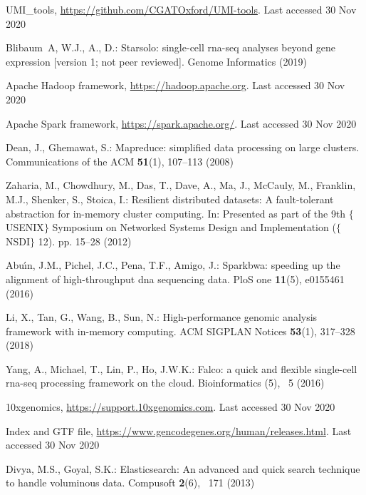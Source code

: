 \documentclass[runningheads]{llncs}
\begin{document}
\begin{thebibliography}{8}
UMI\_tools, \url{https://github.com/CGATOxford/UMI-tools}. Last accessed 30
Nov 2020

Blibaum~A, W.J., A., D.: Starsolo: single-cell rna-seq analyses beyond gene
expression [version 1; not peer reviewed]. Genome Informatics  (2019)

Apache Hadoop framework, \url{https://hadoop.apache.org}. Last accessed 30
Nov 2020

Apache Spark framework, \url{https://spark.apache.org/}. Last accessed 30
Nov 2020

Dean, J., Ghemawat, S.: Mapreduce: simplified data processing on large
clusters. Communications of the ACM  \textbf{51}(1),  107--113 (2008)

Zaharia, M., Chowdhury, M., Das, T., Dave, A., Ma, J., McCauly, M., Franklin,
M.J., Shenker, S., Stoica, I.: Resilient distributed datasets: A
fault-tolerant abstraction for in-memory cluster computing. In: Presented as
part of the 9th $\{$USENIX$\}$ Symposium on Networked Systems Design and
Implementation ($\{$NSDI$\}$ 12). pp. 15--28 (2012)

Abu{\'\i}n, J.M., Pichel, J.C., Pena, T.F., Amigo, J.: Sparkbwa: speeding up
the alignment of high-throughput dna sequencing data. PloS one
\textbf{11}(5),  e0155461 (2016)

Li, X., Tan, G., Wang, B., Sun, N.: High-performance genomic analysis framework
with in-memory computing. ACM SIGPLAN Notices  \textbf{53}(1),  317--328
(2018)

Yang, A., Michael, T., Lin, P., Ho, J.W.K.: Falco: a quick and flexible
single-cell rna-seq processing framework on the cloud. Bioinformatics (5), ~5
(2016)

10xgenomics, \url{https://support.10xgenomics.com}. Last accessed 30
Nov 2020

Index and GTF file, \url{https://www.gencodegenes.org/human/releases.html}. Last accessed 30
Nov 2020

Divya, M.S., Goyal, S.K.: Elasticsearch: An advanced and quick search technique
to handle voluminous data. Compusoft  \textbf{2}(6), ~171 (2013)

\end{thebibliography}
\end{document}
